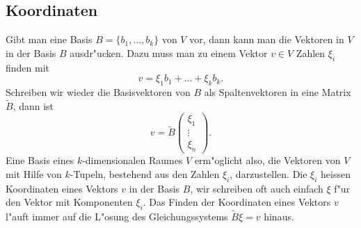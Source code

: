\subsection{Koordinaten}
Gibt man eine Basis $B=\{b_1,\dots,b_k\}$ von $V$ vor,
dann kann man die Vektoren
in $V$ in der Basis $B$ ausdr"ucken.
Dazu muss man zu einem 
Vektor $v\in V$ Zahlen $\xi_i$ finden mit
\[
v=\xi_1 b_1+\dots +\xi_k b_k.
\]
Schreiben wir wieder die Basisvektoren von $B$ als Spaltenvektoren in 
eine Matrix $\tilde B$, dann ist 
\[
v=\tilde B\begin{pmatrix}\xi_1\\\vdots\\\xi_n\end{pmatrix}.
\]
Eine Basis eines $k$-dimensionalen Raumes $V$ erm"oglicht also,
die Vektoren von $V$ mit Hilfe von $k$-Tupeln, bestehend
aus den Zahlen $\xi_i$, darzustellen.
Die $\xi_i$ heissen
Koordinaten eines Vektors $v$ in der Basis $B$, wir schreiben
oft auch einfach $\xi$ f"ur den Vektor mit Komponenten $\xi_i$.
Das Finden der Koordinaten eines Vektors $v$ l"auft immer auf die L"osung
des Gleichungssystems $\tilde B\xi=v$ hinaus.

